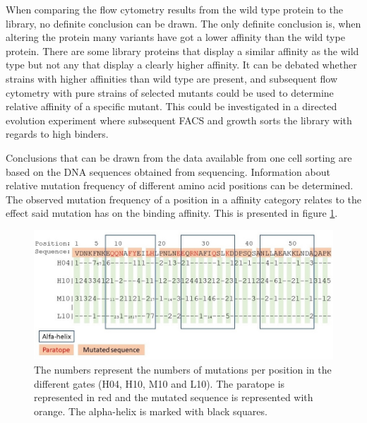 \documentclass{article}
\begin{document}
\begin{multicols}{2}
	When comparing the flow cytometry results from the wild type protein to the library, no definite  conclusion can be drawn. The only definite conclusion is, when altering the protein many variants have got a lower affinity than the wild type protein. There are some library proteins that display a similar affinity as the wild type but not any that display a clearly higher affinity. It can be debated whether strains with higher affinities than wild type are present, and subsequent flow cytometry with pure strains of selected mutants could be used to determine relative affinity of a specific mutant. This could be investigated in a directed evolution experiment where subsequent FACS and growth sorts the library with regards to high binders.
	
	Conclusions that can be drawn from the data available from one cell sorting are based on the DNA sequences obtained from sequencing. Information about relative mutation frequency of different amino acid positions can be determined. The observed mutation frequency of a position in a affinity category relates to the effect said mutation has on the binding affinity. This is presented in figure \ref{freqana}. 
	
\end{multicols}
	\begin{figure}[H]
		\centering
		\includegraphics[width=\linewidth]{images/freqana_cut.jpg}
		\caption{The numbers represent the numbers of mutations per position in the different gates (H04, H10, M10 and L10). The paratope is represented in red and the mutated sequence is represented with orange. The alpha-helix is marked with black squares.}
		\label{freqana}
	\end{figure}
\end{document}
